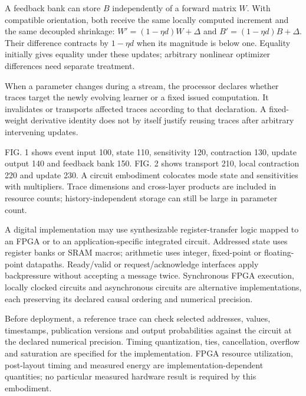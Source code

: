 \documentclass[pct]{sm-patent}
\begin{document}
\pnum A feedback bank can store $B$ independently of a forward matrix $W$. With compatible orientation, both receive the same locally computed increment and the same decoupled shrinkage: $W'=(1-\eta d)W+\Delta$ and $B'=(1-\eta d)B+\Delta$. Their difference contracts by $1-\eta d$ when its magnitude is below one. Equality initially gives equality under these updates; arbitrary nonlinear optimizer differences need separate treatment.

\pnum When a parameter changes during a stream, the processor declares whether traces target the newly evolving learner or a fixed issued computation. It invalidates or transports affected traces according to that declaration. A fixed-weight derivative identity does not by itself justify reusing traces after arbitrary intervening updates.

\pnum FIG. 1 shows event input 100, state 110, sensitivity 120, contraction 130, update output 140 and feedback bank 150. FIG. 2 shows transport 210, local contraction 220 and update 230. A circuit embodiment colocates mode state and sensitivities with multipliers. Trace dimensions and cross-layer products are included in resource counts; history-independent storage can still be large in parameter count.


\pnum A digital implementation may use synthesizable register-transfer logic mapped to an FPGA or to an application-specific integrated circuit. Addressed state uses register banks or SRAM macros; arithmetic uses integer, fixed-point or floating-point datapaths. Ready/valid or request/acknowledge interfaces apply backpressure without accepting a message twice. Synchronous FPGA execution, locally clocked circuits and asynchronous circuits are alternative implementations, each preserving its declared causal ordering and numerical precision.

\pnum Before deployment, a reference trace can check selected addresses, values, timestamps, publication versions and output probabilities against the circuit at the declared numerical precision. Timing quantization, ties, cancellation, overflow and saturation are specified for the implementation. FPGA resource utilization, post-layout timing and measured energy are implementation-dependent quantities; no particular measured hardware result is required by this embodiment.

\claimsstart
\end{document}
